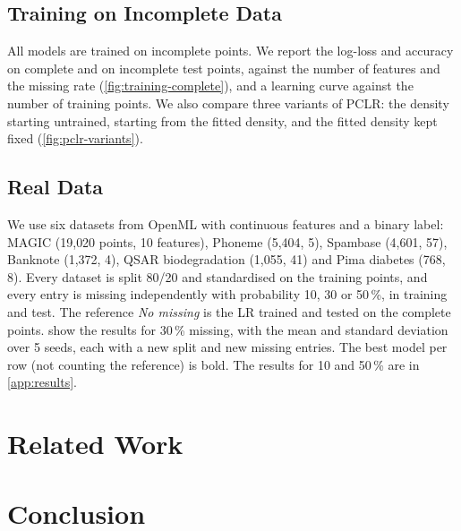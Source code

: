 \subsection{Training on Incomplete Data}
\label{sec:results-training}

\begin{table}[t]
  \centering
  \caption{Log-loss on the incomplete test points, 30\,\% missing.}
  \label{tab:real-log-loss-30}
  \resizebox{0.9\textwidth}{!}{}
\end{table}

\begin{table}[t]
  \centering
  \caption{Accuracy on the incomplete test points, 30\,\% missing.}
  \label{tab:real-accuracy-30}
  \resizebox{0.9\textwidth}{!}{}
\end{table}

All models are trained on incomplete points.
We report the log-loss and accuracy on complete and on incomplete test points, against the number of features and the 
missing rate (\cref{fig:training-complete}), and a learning curve against the number of training points.
We also compare three variants of PCLR: the density starting untrained, starting from the fitted density, 
and the fitted density kept fixed (\cref{fig:pclr-variants}).

\subsection{Real Data}
\label{sec:results-real}

We use six datasets from OpenML with continuous features and a binary label: MAGIC (19{,}020 points, 10 features), 
Phoneme (5{,}404, 5), Spambase (4{,}601, 57), Banknote (1{,}372, 4), QSAR biodegradation (1{,}055, 41) and Pima diabetes (768, 8).
Every dataset is split 80/20 and standardised on the training points, and every entry is missing 
independently with probability 10, 30 or 50\,\%, in training and test.
The reference \emph{No missing} is the LR trained and tested on the complete points.
 show the results for 30\,\% missing, with the mean and standard deviation 
over 5 seeds, each with a new split and new missing entries. The best model per row (not counting the reference) is bold. 
The results for 10 and 50\,\% are in \cref{app:results}.


\section{Related Work}
\label{sec:related-work}

\section{Conclusion}
\label{sec:conclusion}
